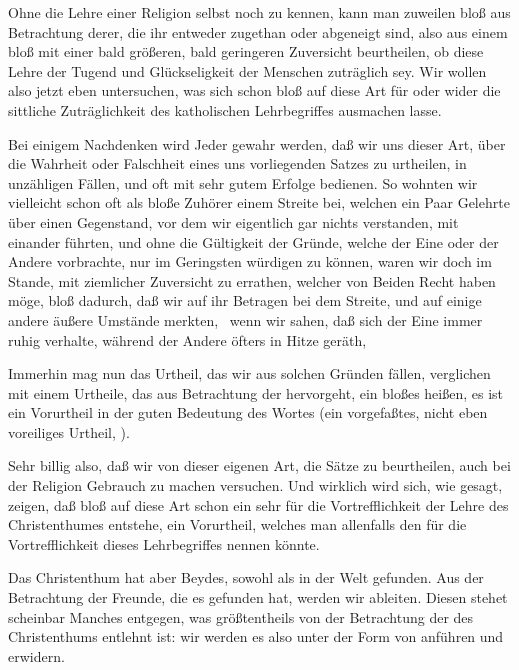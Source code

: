 \begin{aufza}
\item Ohne die Lehre einer Religion selbst noch zu kennen, kann man zuweilen bloß aus Betrachtung derer, die ihr entweder zugethan oder abgeneigt sind, also aus einem bloß  mit einer bald größeren, bald geringeren Zuversicht beurtheilen, ob diese Lehre der Tugend und Glückseligkeit der Menschen zuträglich sey. Wir wollen also jetzt eben untersuchen, was sich schon bloß auf diese Art für oder wider die sittliche Zuträglichkeit des katholischen Lehrbegriffes ausmachen lasse.
\item Bei einigem Nachdenken wird Jeder gewahr werden, daß wir uns dieser Art, über die Wahrheit oder Falschheit eines uns vorliegenden Satzes zu urtheilen, in unzähligen Fällen, und oft mit sehr gutem Erfolge bedienen. So wohnten wir vielleicht schon oft als bloße Zuhörer einem Streite bei, welchen ein Paar Gelehrte über einen Gegenstand, vor dem wir eigentlich gar nichts verstanden, mit einander führten, und ohne die Gültigkeit der Gründe, welche der Eine oder der Andere vorbrachte, nur im Geringsten würdigen zu können, waren wir doch im Stande, mit ziemlicher Zuversicht zu errathen, welcher von Beiden Recht haben möge, bloß dadurch, daß wir auf ihr Betragen bei dem Streite, und auf einige andere äußere Umstände merkten, \zB\ wenn wir sahen, daß sich der Eine immer ruhig verhalte, während der Andere öfters in Hitze geräth, \usw~
\item Immerhin mag nun das Urtheil, das wir aus solchen Gründen fällen, verglichen mit einem Urtheile, das aus Betrachtung der  hervorgeht, ein bloßes  heißen, es ist ein Vorurtheil in der guten Bedeutung des Wortes (ein vorgefaßtes, nicht eben voreiliges Urtheil, ).
\item Sehr billig also, daß wir von dieser eigenen Art, die Sätze zu beurtheilen, auch bei der Religion Gebrauch zu machen versuchen. Und wirklich wird sich, wie gesagt, zeigen, daß bloß auf diese Art schon ein sehr  für die Vortrefflichkeit der Lehre des Christenthumes entstehe, ein Vorurtheil, welches man allenfalls den  für die Vortrefflichkeit dieses Lehrbegriffes nennen könnte.
\item Das Christenthum hat aber Beydes,  sowohl als  in der Welt gefunden. Aus der Betrachtung der Freunde, die es gefunden hat, werden wir  ableiten. Diesen stehet scheinbar Manches entgegen, was größtentheils von der Betrachtung der  des Christenthums entlehnt ist: wir werden es also unter der Form von  anführen und erwidern.
\end{aufza}

